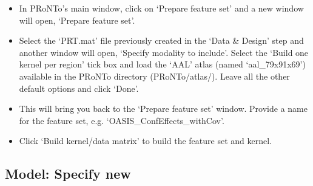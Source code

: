 \begin{itemize}
	
	\item In PRoNTo's main window, click on `Prepare feature set' and a new window will open, `Prepare feature set'.
	
	\item Select the `PRT.mat' file previously created in the `Data \& Design' step and another window will open, `Specify modality to include'. Select the `Build one kernel per region' tick box and load the `AAL' atlas (named `aal\_79x91x69') available in the PRoNTo directory (PRoNTo/atlas/). Leave all the other default options and click `Done'.
		
	\item This will bring you back to the `Prepare feature set' window. Provide a name for the feature set, e.g. `OASIS\_ConfEffects\_withCov'.

	\item Click `Build kernel/data matrix' to build the feature set and kernel.

\end{itemize}



\subsection{Model: Specify new}

